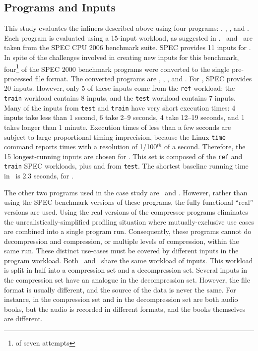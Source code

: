 \subsection{Programs and Inputs}


This study evaluates the inliners described above using four
programs: \bzip, \gzip, \gcc, and \gobmk.  Each program is evaluated
using a 15-input workload, as suggested
in \cite{BerubePhD}.  \Gcc\ and \gobmk\ are taken from the
SPEC CPU 2006 benchmark suite.  SPEC provides 11 inputs for \gcc.  In
spite of the challenges involved in creating new inputs for this
benchmark, four\footnote{of seven attempts} of the SPEC 2000 benchmark
programs were converted to the single pre-processed file format.  The
converted programs are \bzip, \lbm, \mcf, and \parser.  For \gobmk,
SPEC provides 20 inputs.  However, only 5 of these inputs come from
the {\tt ref} workload; the {\tt train} workload contains 8 inputs,
and the {\tt test} workload contains 7 inputs.  Many of the inputs from
{\tt test} and {\tt train} have very short execution times: 4 inputs
take less than 1 second, 6 take 2--9 seconds, 4 take 12--19 seconds,
and 1 takes longer than 1 minute.  Execution times of less than a few
seconds are subject to large proportional timing imprecision, because
the Linux {\tt time} command reports times with a resolution of
1/100$^{th}$ of a second.  Therefore, the 15 longest-running inputs
are chosen for \Wfull.  This set is composed of the {\tt ref} and {\tt
train} SPEC workloads, plus  and  from
{\tt test}.  The shortest baseline running time in \Wfull\ is 2.3
seconds, for .

The other two programs used in the case study are \bzip\ and \gzip.
However, rather than using the SPEC benchmark versions of these
programs, the fully-functional ``real'' versions are used.  Using the
real versions of the compressor programs eliminates the
unrealistically-simplified profiling situation where
mutually-exclusive use cases are combined into a single program run.
Consequently, these programs cannot do decompression and compression,
or multiple levels of compression, within the same run.  These
distinct use-cases must be covered by different inputs in the program
workload.  Both \bzip\ and \gzip\ share the same workload of inputs.
This workload is split in half into a compression set and a
decompression set.  Several inputs in the compression set have an
analogue in the decompression set.  However, the file format is
usually different, and the source of the data is never the same.  For
instance,  in the compression set
and  in the decompression set are both audio
books, but the audio is recorded in different formats, and the books
themselves are different.

